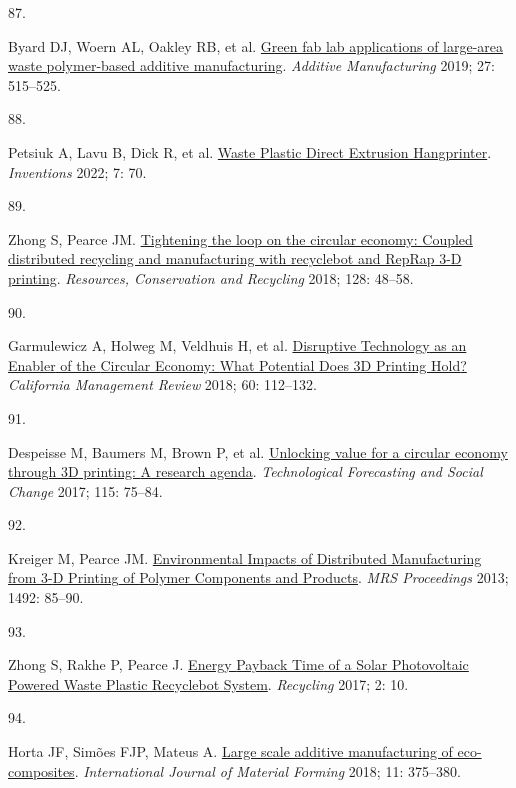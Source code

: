 \documentclass[
  11pt,
  a4paperpaper,
  onecolumn]{article}
\newlength{\cslhangindent}
\newlength{\csllabelwidth}
\newlength{\cslentryspacingunit} %
\newenvironment{CSLReferences}[2] %
 {%
  \setlength{\parindent}{0pt}
  \ifodd #1
  \let\oldpar\par
  \def\par{\hangindent=\cslhangindent\oldpar}
  \fi
  \setlength{\parskip}{#2\cslentryspacingunit}
 }%
 {}
\newcommand{\CSLLeftMargin}[1]{\parbox[t]{\csllabelwidth}{#1}}
\newcommand{\CSLRightInline}[1]{\parbox[t]{\linewidth - \csllabelwidth}{#1}\break}
\begin{document}
\begin{CSLReferences}{0}{0}
\leavevmode{}%
\CSLLeftMargin{87. }%
\CSLRightInline{Byard DJ, Woern AL, Oakley RB, et al.
\href{https://doi.org/10.1016/j.addma.2019.03.006}{Green fab lab
applications of large-area waste polymer-based additive manufacturing}.
\emph{Additive Manufacturing} 2019; 27: 515--525.}

\leavevmode{}%
\CSLLeftMargin{88. }%
\CSLRightInline{Petsiuk A, Lavu B, Dick R, et al.
\href{https://doi.org/10.3390/inventions7030070}{Waste {Plastic Direct
Extrusion Hangprinter}}. \emph{Inventions} 2022; 7: 70.}

\leavevmode{}%
\CSLLeftMargin{89. }%
\CSLRightInline{Zhong S, Pearce JM.
\href{https://doi.org/10.1016/j.resconrec.2017.09.023}{Tightening the
loop on the circular economy: {Coupled} distributed recycling and
manufacturing with recyclebot and {RepRap} 3-{D} printing}.
\emph{Resources, Conservation and Recycling} 2018; 128: 48--58.}

\leavevmode{}%
\CSLLeftMargin{90. }%
\CSLRightInline{Garmulewicz A, Holweg M, Veldhuis H, et al.
\href{https://doi.org/10.1177/0008125617752695}{Disruptive {Technology}
as an {Enabler} of the {Circular Economy}: {What Potential Does 3D
Printing Hold}?} \emph{California Management Review} 2018; 60:
112--132.}

\leavevmode{}%
\CSLLeftMargin{91. }%
\CSLRightInline{Despeisse M, Baumers M, Brown P, et al.
\href{https://doi.org/10.1016/j.techfore.2016.09.021}{Unlocking value
for a circular economy through {3D} printing: {A} research agenda}.
\emph{Technological Forecasting and Social Change} 2017; 115: 75--84.}

\leavevmode{}%
\CSLLeftMargin{92. }%
\CSLRightInline{Kreiger M, Pearce JM.
\href{https://doi.org/10.1557/opl.2013.319}{Environmental {Impacts} of
{Distributed Manufacturing} from 3-{D Printing} of {Polymer Components}
and {Products}}. \emph{MRS Proceedings} 2013; 1492: 85--90.}

\leavevmode{}%
\CSLLeftMargin{93. }%
\CSLRightInline{Zhong S, Rakhe P, Pearce J.
\href{https://doi.org/10.3390/recycling2020010}{Energy {Payback Time} of
a {Solar Photovoltaic Powered Waste Plastic Recyclebot System}}.
\emph{Recycling} 2017; 2: 10.}

\leavevmode{}%
\CSLLeftMargin{94. }%
\CSLRightInline{Horta JF, Simões FJP, Mateus A.
\href{https://doi.org/10.1007/s12289-017-1364-5}{Large scale additive
manufacturing of eco-composites}. \emph{International Journal of
Material Forming} 2018; 11: 375--380.}


\end{CSLReferences}
\end{document}
